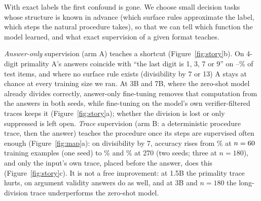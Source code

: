 \documentclass{article}
\theoremstyle{definition}
\begin{document}
With exact labels the first confound is gone. We choose small decision tasks whose structure is known in advance (which surface rules approximate the label, which steps the natural procedure takes), so that we can tell which function the model learned, and what exact supervision of a given format teaches.

\emph{Answer-only} supervision (arm A) teaches a shortcut (Figure~\ref{fig:story}b). On 4-digit primality A's answers coincide with ``the last digit is 1, 3, 7 or 9'' on \primeAagreeLastDigitLo--\primeAagreeLastDigitHi\% of test items, and where no surface rule exists (divisibility by 7 or 13) A stays at chance at every training size we ran. At 3B and 7B, where the zero-shot model already divides correctly, answer-only fine-tuning removes that computation from the answers in both seeds, while fine-tuning on the model's own verifier-filtered traces keeps it (Figure~\ref{fig:story}a); whether the division is lost or only suppressed is left open. \emph{Trace} supervision (arm B: a deterministic procedure trace, then the answer) teaches the procedure once its steps are supervised often enough (Figure~\ref{fig:map}a): on divisibility by 7, accuracy rises from \divsevenBnSixty\% at $n=60$ training examples (one seed) to \divsevenBnTwoSeventysZero\% and \divsevenBnTwoSeventysOne\% at 270 (two seeds; three at $n=180$), and only the input's own trace, placed before the answer, does this (Figure~\ref{fig:story}c). It is not a free improvement: at 1.5B the primality trace hurts, on argument validity answers do as well, and at 3B and $n=180$ the long-division trace underperforms the zero-shot model.
\end{document}
